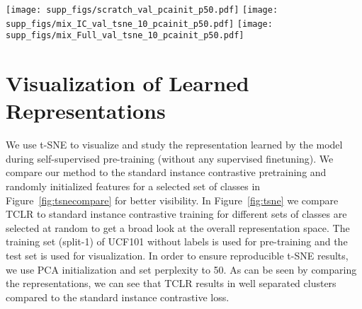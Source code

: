 \documentclass[10pt,twocolumn,letterpaper]{article}
\begin{document}
\begin{figure*}[t]
\vspace{1.5in}
\centering
\begin{center}
    \texttt{[image: supp\_figs/scratch\_val\_pcainit\_p50.pdf]}
    \texttt{[image: supp\_figs/mix\_IC\_val\_tsne\_10\_pcainit\_p50.pdf]}
    \texttt{[image: supp\_figs/mix\_Full\_val\_tsne\_10\_pcainit\_p50.pdf]}
\end{center}
    \caption{t-SNE visualization of Randomly Initialized (left) features; features learned using Instance Contrastive loss (center);  and TCLR (right),  for 10  randomly chosen action classes from UCF101 Test set:  \textcolor{FieldHockeyPenalty}{FieldHockeyPenalty}, \textcolor{GolfSwing}{GolfSwing}, \textcolor{SoccerJuggling}{SoccerJuggling}, \textcolor{SoccerPenalty}{SoccerPenalty}, \textcolor{PlayingGuitar}{PlayingGuitar}, \textcolor{PlayingPiano}{PlayingPiano}, \textcolor{PlayingSitar}{PlayingSitar}, \textcolor{ApplyEyeMakeup}{ApplyEyeMakeup}, \textcolor{ApplyLipstick}{ApplyLipstick} and \textcolor{BlowDryHair}{BlowDryHair}.  TCLR results in more coherent clusters compared to the instance contrastive lossand is able to discriminate between similar classes with fine-grained differences such as \textcolor{ApplyEyeMakeup}{ApplyEyeMakeup}, \textcolor{ApplyLipstick}{ApplyLipstick} and \textcolor{BlowDryHair}{BlowDryHair}.}
    \label{fig:tsnecompare}
    \vspace{0.8in}
\end{figure*}


\section{Visualization of Learned Representations}
\label{sec:tsne}

\vspace{-0.1in}




We use t-SNE \cite{tsne} to visualize and study the representation learned by the model during self-supervised pre-training (without any supervised finetuning).  We compare our method to the standard instance contrastive pretraining and randomly initialized features for a selected set of classes in Figure~\ref{fig:tsnecompare} for better visibility. In Figure~\ref{fig:tsne} we compare TCLR to standard instance contrastive training for different sets of classes are selected at random to get a broad look at the overall representation space. The training set (split-1) of UCF101 without labels is used for pre-training and the test set is used for visualization. In order to ensure reproducible t-SNE results, we use PCA initialization and set perplexity to 50. As can be seen by comparing the representations, we can see that TCLR results in well separated clusters compared to the standard instance contrastive loss.
\end{document}
